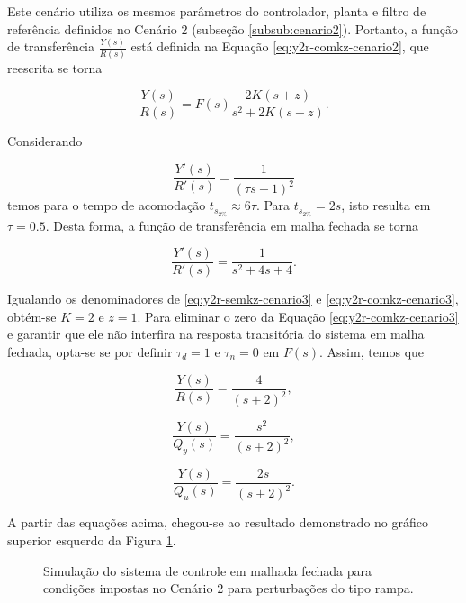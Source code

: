 Este cenário utiliza os mesmos parâmetros do controlador, planta e filtro de
referência definidos no Cenário 2 (subseção \ref{subsub:cenario2}). Portanto, a
função de transferência $\frac{Y(s)}{R(s)}$ está definida na Equação
\ref{eq:y2r-comkz-cenario2}, que reescrita se torna 

\begin{equation}
    \label{eq:y2r-comkz-cenario3}
    \frac{Y(s)}{R(s)} = F(s)\frac{2K(s + z)}{s^2 + 2K(s + z)}.
\end{equation}

Considerando

\begin{equation}
    \label{eq:y2r-com-polos-iguais-cenario3}
    \frac{Y'(s)}{R'(s)} = \frac{1}{(\tau s + 1)^2}
\end{equation}
temos para o tempo de acomodação $t_{s_{2\%}} \approx 6\tau$. Para
$t_{s_{2\%}} = 2s$, isto resulta em $\tau = 0.5$. Desta forma, a função de
transferência em malha fechada se torna

\begin{equation}
    \label{eq:y2r-semkz-cenario3}
    \frac{Y'(s)}{R'(s)} = \frac{1}{s^2 + 4s + 4}.
\end{equation}

Igualando os denominadores de \ref{eq:y2r-semkz-cenario3} e
\ref{eq:y2r-comkz-cenario3}, obtém-se $K = 2$ e $z = 1$. Para eliminar o zero da
Equação \ref{eq:y2r-comkz-cenario3} e garantir que ele não interfira na
resposta transitória do sistema em malha fechada, opta-se se por definir
$\tau_{d} = 1$ e $\tau_{n} = 0$ em $F(s)$. Assim, temos que

\begin{equation}
    \label{eq:y2r-solucionado-cenario3}
    \frac{Y(s)}{R(s)} = \frac{4}{(s + 2)^2},
\end{equation}

\begin{equation}
    \label{eq:y2qy-solucionado-cenario3}
    \frac{Y(s)}{Q_{y}(s)} = \frac{s^2}{(s + 2)^2},
\end{equation}

\begin{equation}
    \label{eq:y2qu-solucionado-cenario3}
    \frac{Y(s)}{Q_{u}(s)} = \frac{2s}{(s + 2)^2}.
\end{equation}

A partir das equações acima, chegou-se ao resultado demonstrado no gráfico
superior esquerdo da Figura \ref{fig:resultado-cenario3}.

\begin{figure}[!ht]
    \caption{Simulação do sistema de controle em malhada fechada para condições
    impostas no Cenário 2 para perturbações do tipo rampa.}
    \vspace{-10pt}
    \hspace{-30pt}
    \label{fig:resultado-cenario3}
    \begin{minipage}{\linewidth}
        
    \end{minipage}
\end{figure}

